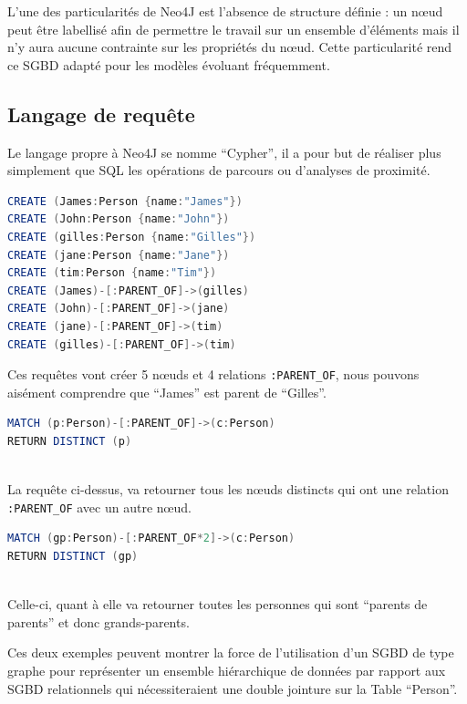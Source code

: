 \documentclass[a4paper,fleqn,12pt,oneside]{book}
\begin{document}
L'une des particularités de Neo4J est l'absence de structure définie : un nœud peut être labellisé afin de permettre le travail sur un ensemble d'éléments mais il n'y aura aucune contrainte sur les propriétés du nœud. Cette particularité rend ce SGBD adapté pour les modèles évoluant fréquemment.


\subsection{Langage de requête}

Le langage propre à Neo4J se nomme \enquote{Cypher}\label{Cypher}, il a pour but de réaliser plus simplement que SQL les opérations de parcours ou d'analyses de proximité.

\begin{lstlisting}[language=java, frame=single]
CREATE (James:Person {name:"James"})
CREATE (John:Person {name:"John"})
CREATE (gilles:Person {name:"Gilles"})
CREATE (jane:Person {name:"Jane"})
CREATE (tim:Person {name:"Tim"})
CREATE (James)-[:PARENT_OF]->(gilles)
CREATE (John)-[:PARENT_OF]->(jane)
CREATE (jane)-[:PARENT_OF]->(tim)
CREATE (gilles)-[:PARENT_OF]->(tim)
\end{lstlisting}

Ces requêtes vont créer 5 nœuds et 4 relations \texttt{:PARENT\_OF}, nous pouvons aisément comprendre que \enquote{James} est parent de \enquote{Gilles}.

\begin{lstlisting}[language=java, frame=single]
MATCH (p:Person)-[:PARENT_OF]->(c:Person) 
RETURN DISTINCT (p)
	
\end{lstlisting}

La requête ci-dessus, va retourner tous les nœuds distincts qui ont une relation \texttt{:PARENT\_OF} avec un autre nœud.

\begin{lstlisting}[language=java, frame=single]
MATCH (gp:Person)-[:PARENT_OF*2]->(c:Person) 
RETURN DISTINCT (gp)
	
\end{lstlisting}

Celle-ci, quant à elle va retourner toutes les personnes qui sont \enquote{parents de parents} et donc grands-parents. 

Ces deux exemples peuvent montrer la force de l’utilisation d’un SGBD de type graphe pour représenter un ensemble hiérarchique de données par rapport aux SGBD relationnels qui nécessiteraient une double jointure sur la Table \enquote{Person}.
\end{document}
